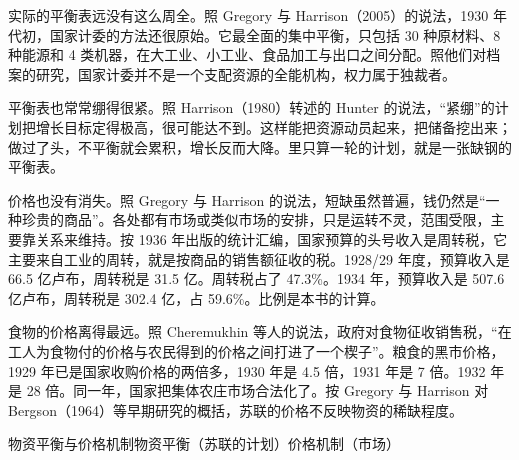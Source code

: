 实际的平衡表远没有这么周全。照 Gregory 与 Harrison（2005）的说法，1930 年代初，国家计委的方法还很原始\cite{gregory2005}。它最全面的集中平衡，只包括 30 种原材料、8 种能源和 4 类机器，在大工业、小工业、食品加工与出口之间分配\cite{gregory2005}。照他们对档案的研究，国家计委并不是一个支配资源的全能机构，权力属于独裁者\cite{gregory2005}。

平衡表也常常绷得很紧。照 Harrison（1980）转述的 Hunter 的说法，“紧绷”的计划把增长目标定得极高，很可能达不到\cite{harrison1980}。这样能把资源动员起来，把储备挖出来；做过了头，不平衡就会累积，增长反而大降\cite{harrison1980}。里只算一轮的计划，就是一张缺钢的平衡表。

价格也没有消失。照 Gregory 与 Harrison 的说法，短缺虽然普遍，钱仍然是“一种珍贵的商品”\cite{gregory2005}。各处都有市场或类似市场的安排，只是运转不灵，范围受限，主要靠关系来维持\cite{gregory2005}。按 1936 年出版的统计汇编，国家预算的头号收入是周转税，它主要来自工业的周转，就是按商品的销售额征收的税\cite{sc1936}。1928/29 年度，预算收入是 66.5 亿卢布，周转税是 31.5 亿\cite{sc1936}。周转税占了 47.3\%。1934 年，预算收入是 507.6 亿卢布，周转税是 302.4 亿，占 59.6\%\cite{sc1936}。比例是本书的计算。

食物的价格离得最远。照 Cheremukhin 等人的说法，政府对食物征收销售税，“在工人为食物付的价格与农民得到的价格之间打进了一个楔子”\cite{cggt2013}。粮食的黑市价格，1929 年已是国家收购价格的两倍多，1930 年是 4.5 倍，1931 年是 7 倍\cite{cggt2013}。1932 年是 28 倍\cite{cggt2013}。同一年，国家把集体农庄市场合法化了\cite{cggt2013}。按 Gregory 与 Harrison 对 Bergson（1964）等早期研究的概括，苏联的价格不反映物资的稀缺程度\cite{gregory2005}。

\begin{compare}{物资平衡与价格机制}{物资平衡（苏联的计划）}{价格机制（市场）}
\end{compare}

